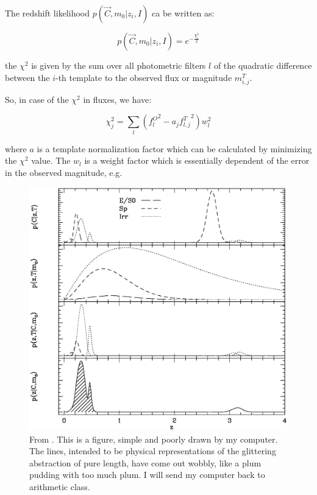 \documentclass[9pt]{memoir}
\begin{document}
The redshift likelihood $p(\vec{C}, m_0|z_i,I)$ ca be written as:

\begin{equation}
p(\vec{C}, m_0|z_i,I) = e^{-\frac{\chi_i^2}{2}}
\end{equation}

the $\chi^2$ is given by the sum over all photometric filters $l$ of the quadratic difference between the $i$-th template to the observed flux or magnitude $m^T_{i,j}$.

So, in case of the $\chi^2$ in fluxes, we have:

\begin{equation}
\chi^2_j = \sum_l \left( {f^O_l}^2 - a_j {f^T_{l,j}}^2 \right) w^2_l
\end{equation}

where $a$ is a template normalization factor which can be calculated by minimizing the $\chi^2$ value. The $w_l$ is a weight factor which is essentially dependent of the error in the observed magnitude, e.g. %


\begin{figure}
\begin{adjustwidth*}{1in}{0pt}
\centering
\includegraphics[width=1.3\textwidth]{figures/figpeaks.eps}
\end{adjustwidth*}
\caption{From \cite{Benitez.2000a}. This is a figure, simple and poorly drawn by my computer. The lines, intended to be physical representations of the glittering abstraction of pure length, have come out wobbly, like a plum pudding with too much plum. I will send my computer back to arithmetic class.}
\label{fig:myfig}
\end{figure}
\end{document}
